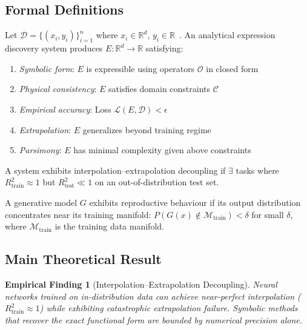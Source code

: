 \documentclass[twoside,11pt]{article}
\newcommand{\Rtrain}{R^{2}_{\mathrm{train}}}
\newcommand{\Rtest}{R^{2}_{\mathrm{test}}}
\newtheorem{finding}{Empirical Finding}
\begin{document}
\subsection{Formal Definitions}\label{subsec:formal-definitions}
\label{sec:theory_defs}

\begin{definition}
Let $\mathcal{D} = \{(x_i, y_i)\}_{i=1}^n$ where $x_i \in \mathbb{R}^d$, $y_i \in \mathbb{R}$~\citep{udrescu2020ai}. An analytical expression discovery system produces $E: \mathbb{R}^d \to \mathbb{R}$ satisfying:
\begin{enumerate}
  \item \textit{Symbolic form}: $E$ is expressible using operators $\mathcal{O}$ in closed form
  \item \textit{Physical consistency}: $E$ satisfies domain constraints $\mathcal{C}$
  \item \textit{Empirical accuracy}: Loss $\mathcal{L}(E, \mathcal{D}) < \epsilon$
  \item \textit{Extrapolation}: $E$ generalizes beyond training regime
  \item \textit{Parsimony}: $E$ has minimal complexity given above constraints
\end{enumerate}
\end{definition}

\begin{definition}
\label{def:decoupling}
A system exhibits interpolation--extrapolation decoupling if $\exists$ tasks where $\Rtrain \approx 1$ but $\Rtest \ll 1$ on an out-of-distribution test set.
\end{definition}

\begin{definition}
\label{def:reproductive}
A generative model $G$ exhibits reproductive behaviour if its output distribution concentrates near its training manifold: $P(G(x) \notin \mathcal{M}_{\text{train}}) < \delta$ for small $\delta$, where $\mathcal{M}_{\text{train}}$ is the training data manifold.
\end{definition}

\subsection{Main Theoretical Result}\label{subsec:main-theoretical-result}
\label{sec:theory_main}

\begin{finding}[Interpolation--Extrapolation Decoupling]
\label{prop:interp_extrap_decoupling}
Neural networks trained on in-distribution data can achieve near-perfect interpolation ($\Rtrain \approx 1$) while exhibiting catastrophic extrapolation failure. Symbolic methods that recover the exact functional form are bounded by numerical precision alone.
\end{finding}
\end{document}
